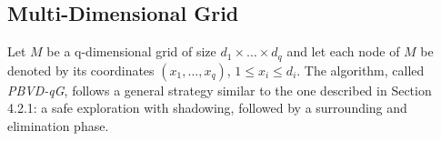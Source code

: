 \subsection{Multi-Dimensional Grid}
Let $M$ be a q-dimensional grid of size $d_1\times\ldots\times d_q$ and let each node of $M$ be denoted by its coordinates $(x_1,\ldots,x_q)$, $1\leq x_i\leq d_i$. The algorithm, called {\em PBVD-qG}, follows a general strategy similar to the one described in Section 4.2.1: a safe exploration with shadowing, followed by a surrounding and elimination phase. 









